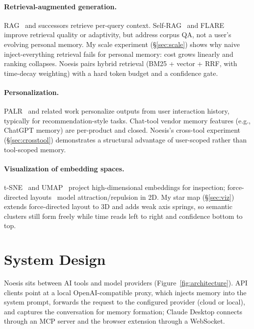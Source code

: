 \documentclass[11pt]{article}
\begin{document}
\paragraph{Retrieval-augmented generation.}
RAG~\citep{lewis2020rag} and successors retrieve per-query context.
Self-RAG~\citep{selfrag} and FLARE~\citep{flare} improve retrieval quality
or adaptivity, but address corpus QA, not a user's evolving personal memory.
My scale experiment (\S\ref{sec:scale}) shows why naive inject-everything
retrieval fails for personal memory: cost grows linearly and ranking
collapses. Noesis pairs hybrid retrieval (BM25 + vector + RRF, with
time-decay weighting) with a hard token budget and a confidence gate.

\paragraph{Personalization.}
PALR~\citep{palr} and related work personalize outputs from user interaction
history, typically for recommendation-style tasks. Chat-tool vendor memory
features (e.g., ChatGPT memory) are per-product and closed. Noesis's
cross-tool experiment (\S\ref{sec:crosstool}) demonstrates a structural
advantage of user-scoped rather than tool-scoped memory.

\paragraph{Visualization of embedding spaces.}
t-SNE~\citep{tsne} and UMAP~\citep{umap} project high-dimensional
embeddings for inspection; force-directed layouts~\citep{forcedirected}
model attraction/repulsion in 2D. My star map (\S\ref{sec:viz}) extends
force-directed layout to 3D and adds weak axis springs, so semantic
clusters still form freely while time reads left to right and confidence
bottom to top.

\section{System Design}
\label{sec:system}

Noesis sits between AI tools and model providers (Figure~\ref{fig:architecture}).
API clients point at a local OpenAI-compatible proxy, which injects memory
into the system prompt, forwards the request to the configured provider
(cloud or local), and captures the conversation for memory formation;
Claude Desktop connects through an MCP server and the browser extension
through a WebSocket.
\end{document}
